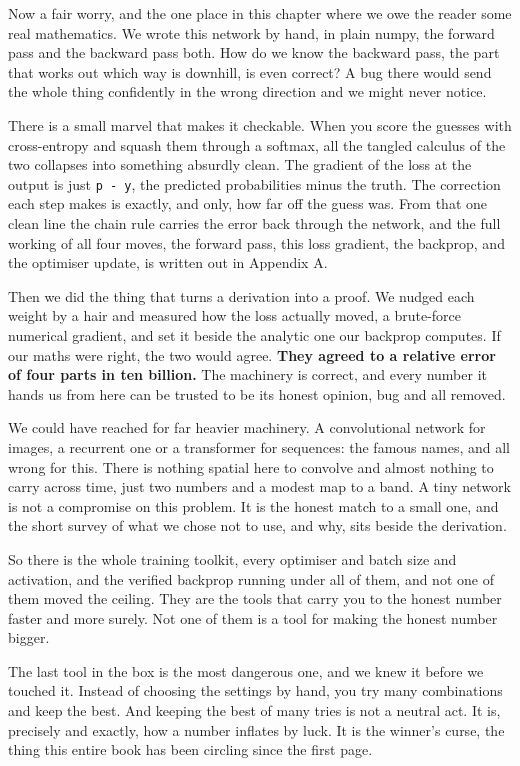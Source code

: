 \documentclass[11pt]{article} %
\begin{document}
Now a fair worry, and the one place in this chapter where we owe the reader some real mathematics. We wrote this network by hand, in plain numpy, the forward pass and the backward pass both. How do we know the backward pass, the part that works out which way is downhill, is even correct? A bug there would send the whole thing confidently in the wrong direction and we might never notice.

There is a small marvel that makes it checkable. When you score the guesses with cross-entropy and squash them through a softmax, all the tangled calculus of the two collapses into something absurdly clean. The gradient of the loss at the output is just \texttt{p - y}, the predicted probabilities minus the truth. The correction each step makes is exactly, and only, how far off the guess was. From that one clean line the chain rule carries the error back through the network, and the full working of all four moves, the forward pass, this loss gradient, the backprop, and the optimiser update, is written out in Appendix A.

Then we did the thing that turns a derivation into a proof. We nudged each weight by a hair and measured how the loss actually moved, a brute-force numerical gradient, and set it beside the analytic one our backprop computes. If our maths were right, the two would agree. \textbf{They agreed to a relative error of four parts in ten billion.} The machinery is correct, and every number it hands us from here can be trusted to be its honest opinion, bug and all removed.

We could have reached for far heavier machinery. A convolutional network for images, a recurrent one or a transformer for sequences: the famous names, and all wrong for this. There is nothing spatial here to convolve and almost nothing to carry across time, just two numbers and a modest map to a band. A tiny network is not a compromise on this problem. It is the honest match to a small one, and the short survey of what we chose not to use, and why, sits beside the derivation.

So there is the whole training toolkit, every optimiser and batch size and activation, and the verified backprop running under all of them, and not one of them moved the ceiling. They are the tools that carry you to the honest number faster and more surely. Not one of them is a tool for making the honest number bigger.

The last tool in the box is the most dangerous one, and we knew it before we touched it. Instead of choosing the settings by hand, you try many combinations and keep the best. And keeping the best of many tries is not a neutral act. It is, precisely and exactly, how a number inflates by luck. It is the winner's curse, the thing this entire book has been circling since the first page.
\end{document}
